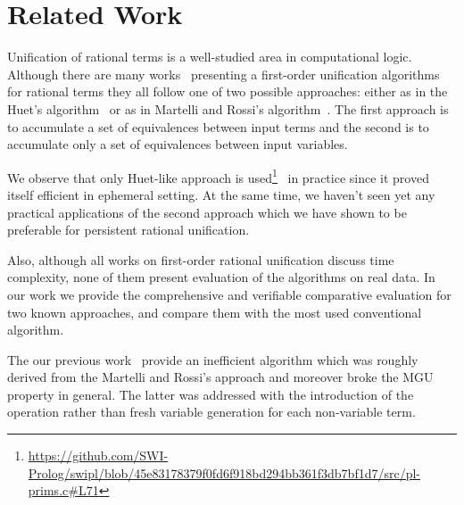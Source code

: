 \section{Related Work}

Unification of rational terms is a well-studied area in computational logic. Although there are many
works~\cite{huet1976resolution, martelli1984efficient, mukai1983unification, jaffar1984efficient} presenting a
first-order unification algorithms for rational terms they all follow one of two possible approaches: either as
in the Huet's algorithm~\cite{huet1976resolution} or as in Martelli and Rossi's algorithm~\cite{martelli1984efficient}.
The first approach is to accumulate a set of equivalences between input terms and the second is to accumulate only a
set of equivalences between input variables.

We observe that only Huet-like approach is used\footnote{\url{https://github.com/SWI-Prolog/swipl/blob/45e83178379f0fd6f918bd294bb361f3db7bf1d7/src/pl-prims.c\#L71}}~\cite{gauthier2004numbering} in practice since it proved itself efficient in ephemeral setting. At the same time, we haven't seen yet
any practical applications of the second approach which we have shown to be preferable for persistent rational unification.

Also, although all works on first-order rational unification discuss time complexity, none of them present evaluation of the algorithms on real data. In our work
we provide the comprehensive and verifiable comparative evaluation for two known approaches, and compare them with the most used conventional algorithm.

The our previous work~\cite{domoratskiy2025empirical} provide an inefficient algorithm which was roughly derived from the Martelli and Rossi's approach and moreover broke the MGU property in general. The latter was addressed with the introduction of the \commonpart operation rather than fresh variable generation for each non-variable term.
